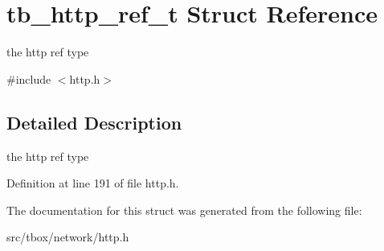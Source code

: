 \hypertarget{structtb__http__ref__t}{\section{tb\-\_\-http\-\_\-ref\-\_\-t Struct Reference}
\label{structtb__http__ref__t}
}


the http ref type  




{\ttfamily \#include $<$http.\-h$>$}



\subsection{Detailed Description}
the http ref type 

Definition at line 191 of file http.\-h.



The documentation for this struct was generated from the following file\-:\begin{DoxyCompactItemize}
\item 
src/tbox/network/http.\-h\end{DoxyCompactItemize}
